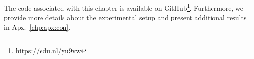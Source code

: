 The code associated with this chapter is available on GitHub\footnote{\url{https://edu.nl/yu9vw}}.
Furthermore, we provide more details about the experimental setup and present additional results in Apx.~\ref{chp:apx:con}.

